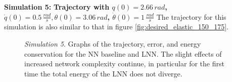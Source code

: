 \documentclass[a4paper]{article}
\begin{document}
\textbf{Simulation 5:} \textbf{Trajectory with $q(0)=2.66\, rad$, $\dot{q}(0)=0.5\, \frac{rad}{s}, \theta(0)=3.06\, rad$, $\dot{\theta}(0)=1\, \frac{rad}{s}$}
The trajectory for this simulation is also similar to that in figure \ref{fig:desired_elastic_150_175}.

\begin{figure}
    \centering
    \qquad
    \caption{\textit{Simulation 5}. Graphs of the trajectory, error, and energy conservation for the NN baseline and LNN. The slight effects of increased network complexity continue, in particular for the first time the total energy of the LNN does not diverge.}
    \label{fig:elastic_700_150_175}
\end{figure}
\end{document}
